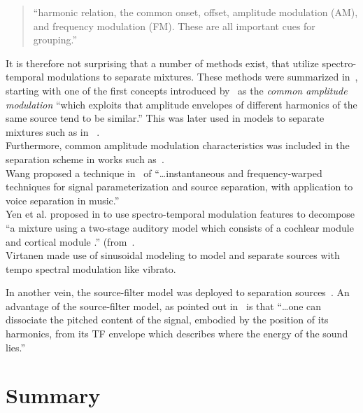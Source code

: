 \begin{quote}
``harmonic relation, the common onset, offset, amplitude modulation (AM), and frequency modulation (FM). These are all important cues for grouping.''
\end{quote}

It is therefore not surprising that a number of methods exist, that utilize spectro-temporal modulations to separate mixtures. 
These methods were summarized in~\cite{rafii}, starting with one of the first concepts introduced by~\cite{bregman90} as the \emph{common amplitude modulation} ``which exploits that amplitude envelopes of different harmonics of the same source tend to be similar.''
This was later used in models to separate mixtures such as in ~\cite{li07, li09}.\\
Furthermore, common amplitude modulation characteristics was included in the separation scheme in works such as~\cite{cano14}.\\
Wang proposed a technique in~\cite{wang94,wang95} of ``\dots instantaneous and frequency-warped techniques for signal parameterization and source separation, with application to voice separation in music.''\\
Yen et al. proposed in \cite{yen14,yen15} to use spectro-temporal modulation features to decompose ``a mixture using a two-stage auditory model which consists of a cochlear module \cite{chi05} and cortical module \cite{chi99}.'' (from~\cite{rafii}.\\
Virtanen made use of sinusoidal modeling \cite{virtanen00} to model and separate sources with tempo spectral modulation like vibrato.

In another vein, the source-filter model was deployed to separation sources~\cite{hennequin10}.
An advantage of the source-filter model, as pointed out in~\cite{rafii} is that ``\dots one can dissociate the pitched content of the signal, embodied by the position of its harmonics, from its TF envelope which describes where the energy of the sound lies.''

\section{Summary}

